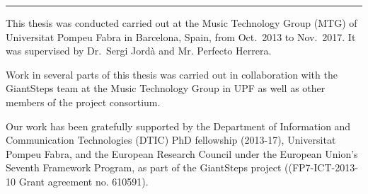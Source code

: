 
\vspace*{\fill}


\begin{center}
	\rule{0.3\textwidth}{.4pt}
\end{center}

This thesis was conducted carried out at the Music Technology Group (MTG) of Universitat Pompeu Fabra in Barcelona, Spain, from Oct.~2013 to Nov.~2017. It was supervised by Dr.~Sergi Jordà and Mr. Perfecto Herrera.

Work in several parts of this thesis was carried out in collaboration with the GiantSteps team at the  Music Technology Group in UPF as well as other members of the project consortium.

Our work has been gratefully supported by the Department of Information and Communication Technologies (DTIC) PhD fellowship (2013-17), Universitat Pompeu Fabra, and the European Research Council under the European Union’s Seventh Framework Program, as part of the GiantSteps project ((FP7-ICT-2013-10 Grant agreement no. 610591).
